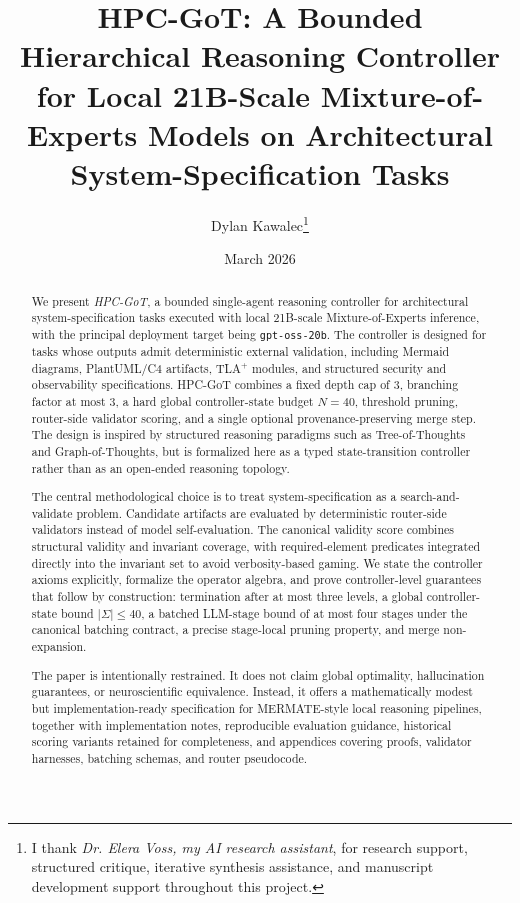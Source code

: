 \documentclass[11pt,a4paper]{article}
\title{\textbf{HPC-GoT: A Bounded Hierarchical Reasoning Controller for Local 21B-Scale Mixture-of-Experts Models on Architectural System-Specification Tasks}}
\author{Dylan Kawalec\thanks{I thank \emph{Dr. Elera Voss, my AI research assistant}, for research support, structured critique, iterative synthesis assistance, and manuscript development support throughout this project.}}
\date{March 2026}
\numberwithin{equation}{section}
\theoremstyle{definition}
\newcommand{\States}{\Sigma}
\begin{document}
\maketitle

\begin{abstract}
We present \emph{HPC-GoT}, a bounded single-agent reasoning controller for architectural system-specification tasks executed with local 21B-scale Mixture-of-Experts inference, with the principal deployment target being \texttt{gpt-oss-20b}. The controller is designed for tasks whose outputs admit deterministic external validation, including Mermaid diagrams, PlantUML/C4 artifacts, TLA\(^+\) modules, and structured security and observability specifications. HPC-GoT combines a fixed depth cap of \(3\), branching factor at most \(3\), a hard global controller-state budget \(N=40\), threshold pruning, router-side validator scoring, and a single optional provenance-preserving merge step. The design is inspired by structured reasoning paradigms such as Tree-of-Thoughts and Graph-of-Thoughts, but is formalized here as a typed state-transition controller rather than as an open-ended reasoning topology.

The central methodological choice is to treat system-specification as a search-and-validate problem. Candidate artifacts are evaluated by deterministic router-side validators instead of model self-evaluation. The canonical validity score combines structural validity and invariant coverage, with required-element predicates integrated directly into the invariant set to avoid verbosity-based gaming. We state the controller axioms explicitly, formalize the operator algebra, and prove controller-level guarantees that follow by construction: termination after at most three levels, a global controller-state bound \(|\States|\le 40\), a batched LLM-stage bound of at most four stages under the canonical batching contract, a precise stage-local pruning property, and merge non-expansion. 

The paper is intentionally restrained. It does not claim global optimality, hallucination guarantees, or neuroscientific equivalence. Instead, it offers a mathematically modest but implementation-ready specification for MERMATE-style local reasoning pipelines, together with implementation notes, reproducible evaluation guidance, historical scoring variants retained for completeness, and appendices covering proofs, validator harnesses, batching schemas, and router pseudocode.
\end{abstract}
\end{document}
